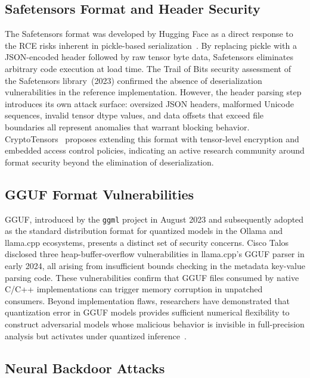 \documentclass[sigconf,review]{acmart}
\begin{document}
\subsection{Safetensors Format and Header Security}

The Safetensors format was developed by Hugging Face as a direct response
to the RCE risks inherent in pickle-based serialization~\cite{safetensors2025empirical}.
By replacing pickle with a JSON-encoded header followed by raw tensor byte
data, Safetensors eliminates arbitrary code execution at load time. The
Trail of Bits security assessment of the Safetensors library~(2023)
confirmed the absence of deserialization vulnerabilities in the reference
implementation. However, the header parsing step introduces its own attack
surface: oversized JSON headers, malformed Unicode sequences, invalid tensor
dtype values, and data offsets that exceed file boundaries all represent
anomalies that warrant blocking behavior. CryptoTensors~\cite{cryptotensors2024}
proposes extending this format with tensor-level encryption and embedded
access control policies, indicating an active research community around
format security beyond the elimination of deserialization.

\subsection{GGUF Format Vulnerabilities}

GGUF, introduced by the \texttt{ggml} project in August 2023 and
subsequently adopted as the standard distribution format for quantized
models in the Ollama and llama.cpp ecosystems, presents a distinct set of
security concerns. Cisco Talos disclosed three heap-buffer-overflow
vulnerabilities in llama.cpp's GGUF parser in early 2024, all arising from
insufficient bounds checking in the metadata key-value parsing code. These
vulnerabilities confirm that GGUF files consumed by native C/C++
implementations can trigger memory corruption in unpatched consumers.
Beyond implementation flaws, researchers have demonstrated that quantization
error in GGUF models provides sufficient numerical flexibility to construct
adversarial models whose malicious behavior is invisible in full-precision
analysis but activates under quantized inference~\cite{gguf_quantization_attack2024}.

\subsection{Neural Backdoor Attacks}
\end{document}
